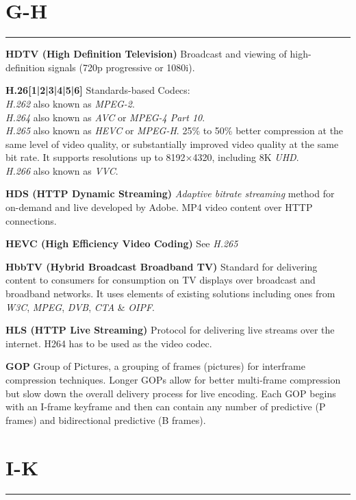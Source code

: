 \section{G-H}
\hrule

\medskip
\textbf{HDTV (High Definition Television)}
Broadcast and viewing of high-definition signals (720p progressive or 1080i).

\smallskip
\textbf{H.26[1|2|3|4|5|6]}
Standards-based Codecs:\\
\textit{H.262} also known as \textit{MPEG-2}.\\
\textit{H.264} also known as \textit{AVC} or  \textit{MPEG-4 Part 10}.\\
\textit{H.265} also known as \textit{HEVC} or \textit{MPEG-H}. 25\% to 50\% better compression at the same level of video quality, or substantially improved video quality at the same bit rate. It supports resolutions up to 8192×4320, including 8K \textit{UHD}.\\
\textit{H.266} also known as \textit{VVC}.

\smallskip
\textbf{HDS (HTTP Dynamic Streaming)}
\textit{Adaptive bitrate streaming} method for on-demand and live developed by Adobe. MP4 video content over HTTP connections.

\smallskip
\textbf{HEVC (High Efficiency Video Coding)}
See \textit{H.265}

\smallskip
\textbf{HbbTV (Hybrid Broadcast Broadband TV)}
Standard for delivering content to consumers for consumption on TV displays over broadcast and broadband networks. It uses elements of existing solutions including ones from \textit{W3C}, \textit{MPEG}, \textit{DVB}, \textit{CTA} \& \textit{OIPF}.

\smallskip
\textbf{HLS (HTTP Live Streaming)}
Protocol for delivering live streams over the internet.
H264 has to be used as the video codec.



\smallskip
\textbf{GOP}
Group of Pictures, a grouping of frames (pictures) for interframe compression techniques. Longer GOPs allow for better multi-frame compression but slow down the overall delivery process for live encoding. Each GOP begins with an I-frame keyframe and then can contain any number of predictive (P frames) and bidirectional predictive (B frames).


\section{I-K}
\hrule

